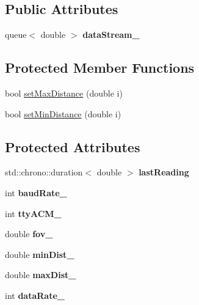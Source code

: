 \subsection*{Public Attributes}
\begin{DoxyCompactItemize}
\item 
queue$<$ double $>$ {\bfseries data\+Stream\+\_\+}\hypertarget{classRanger_a82f7e4ae6cd80d31baf5118a3df877ab}{}\label{classRanger_a82f7e4ae6cd80d31baf5118a3df877ab}

\end{DoxyCompactItemize}
\subsection*{Protected Member Functions}
\begin{DoxyCompactItemize}
\item 
bool \hyperlink{classRanger_ac191d948d1a1451927f0a856f131fed0}{set\+Max\+Distance} (double i)
\item 
bool \hyperlink{classRanger_ac3c89ae3ce2b6529f385ac356ca899f6}{set\+Min\+Distance} (double i)
\end{DoxyCompactItemize}
\subsection*{Protected Attributes}
\begin{DoxyCompactItemize}
\item 
std\+::chrono\+::duration$<$ double $>$ {\bfseries last\+Reading}\hypertarget{classRanger_a1bdab7210a1469ffff99eedd28f8b7e6}{}\label{classRanger_a1bdab7210a1469ffff99eedd28f8b7e6}

\item 
int {\bfseries baud\+Rate\+\_\+}\hypertarget{classRanger_aced6f17f9f3e14fb3a74d041d239d021}{}\label{classRanger_aced6f17f9f3e14fb3a74d041d239d021}

\item 
int {\bfseries tty\+A\+C\+M\+\_\+}\hypertarget{classRanger_affe5d5e2bcd736aa64fe36e8c305ebb6}{}\label{classRanger_affe5d5e2bcd736aa64fe36e8c305ebb6}

\item 
double {\bfseries fov\+\_\+}\hypertarget{classRanger_a43cc24e0ee22c92224eb6279f5da18d1}{}\label{classRanger_a43cc24e0ee22c92224eb6279f5da18d1}

\item 
double {\bfseries min\+Dist\+\_\+}\hypertarget{classRanger_a162f6de8033276f58138b46d39b78361}{}\label{classRanger_a162f6de8033276f58138b46d39b78361}

\item 
double {\bfseries max\+Dist\+\_\+}\hypertarget{classRanger_a46504fe73b39234252b9f93d9a6423a7}{}\label{classRanger_a46504fe73b39234252b9f93d9a6423a7}

\item 
int {\bfseries data\+Rate\+\_\+}\hypertarget{classRanger_a0e489954008a72da7eb57884b6ba5a73}{}\label{classRanger_a0e489954008a72da7eb57884b6ba5a73}

\end{DoxyCompactItemize}


